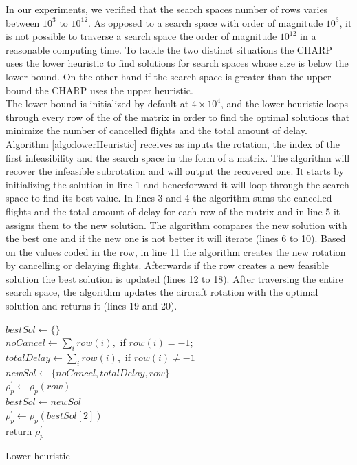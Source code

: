 In our experiments, we verified that the search spaces number of rows varies between $10^3$ to $10^{12}$. As opposed to a search space with order of magnitude $10^3$, it is not possible to traverse a search space the order of magnitude $10^{12}$ in a reasonable computing time.  To tackle the two distinct situations the CHARP uses the lower heuristic to find solutions for search spaces whose size is below the lower bound. On the other hand if the search space is greater than the upper bound the CHARP uses the upper heuristic.\\
The lower bound is initialized by default at $4 \times 10^4$, and the lower heuristic loops through every row of the of the matrix in order to find the optimal solutions that minimize the number of cancelled flights and the total amount of delay. Algorithm \ref{algo:lowerHeuristic} receives as inputs the rotation, the index of the first infeasibility and the search space in the form of a matrix. The algorithm will recover the infeasible subrotation and will output the recovered one. It starts by initializing the solution in line 1 and henceforward it will loop through the search space to find its best value. In lines 3 and 4 the algorithm sums the cancelled flights and the total amount of delay for each row of the matrix and in line 5 it assigns them to the new solution. The algorithm compares the new solution with the best one and if the new one is not better it will iterate (lines 6 to 10). Based on the values coded in the row, in line 11 the algorithm creates the new rotation by cancelling or delaying flights. Afterwards if the row creates a new feasible solution the best solution is updated (lines 12 to 18). After traversing the entire search space, the algorithm updates the aircraft rotation with the optimal solution and returns it (lines 19 and 20).\\

\begin{algorithm}[]
	\DontPrintSemicolon
	
	$bestSol \gets \{\}$\\
	{
		$noCancel \gets \sum_{i} row(i),$ if $row(i) = -1$;\\
		$totalDelay \gets \sum_{i} row(i),$ if $row(i) \ne -1$	\\
		$newSol \gets \{noCancel, totalDelay, row\} $\\
		$\rho^\prime_p \gets \rho_p(row)$\\
		$bestSol \gets newSol$\\
		
	}
	$\rho^\prime_p \gets \rho_p(bestSol[2]) $\\
	return $\rho^\prime_p$
	\caption{Lower heuristic}
	\label{algo:lowerHeuristic}
\end{algorithm}


